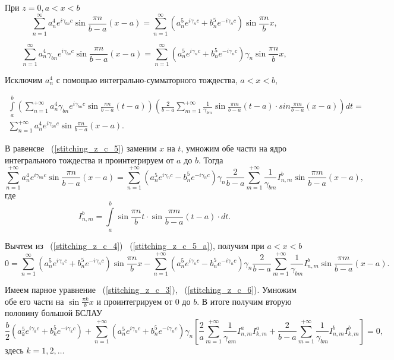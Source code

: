 При $z = 0, a < x < b$
\begin{equation}
	\label{stitching_z_c_4}
	\sum\limits_{n=1}^{\infty}a_n^4e^{i\gamma_{bn}c}\sin{\frac{\pi n}{b-a}(x-a)} = \sum\limits_{n=1}^{\infty}\left(a_n^5e^{i\gamma_{n}c}+b_n^5e^{-i\gamma_{n}c}\right)\sin{\frac{\pi n}{b}x},	
\end{equation}

\begin{equation}
	\label{stitching_z_c_5}
	\sum\limits_{n=1}^{\infty}a_n^4\gamma_{bn}e^{i\gamma_{bn}c}\sin{\frac{\pi n}{b-a}(x-a)} = \sum\limits_{n=1}^{\infty}\left(a_n^5e^{i\gamma_{n}c}+b_n^5e^{-i\gamma_{n}c}\right)\gamma_{n}\sin{\frac{\pi n}{b}x},	
\end{equation}

Исключим $a_n^4$ с помощью интегрально-сумматорного тождества, $a < x < b$,

\begin{multline*}
	\int\limits_a^b\left(\sum\limits_{n=1}^{+\infty}a_n^4\gamma_{bn}e^{i\gamma_{bn}c}\sin{\frac{\pi n}{b-a}(t-a)}\right)\left(\frac{2}{b-a}\sum\limits_{m=1}^{+\infty}\frac{1}{\gamma_{bm}}\sin{\frac{\pi m}{b-a}(t-a)} \cdot sin{\frac{\pi m}{b-a}(x-a)}\right)dt
	= \\
	\sum\limits_{n=1}^{+\infty}a_n^4e^{i\gamma_{bn}c}\sin{\frac{\pi n}{b-a}(x-a)}.
\end{multline*}

В равенсве ~(\ref{stitching_z_c_5}) заменим $x$ на $t$, умножим обе части на ядро интегрального тождества и проинтегрируем от $a$ до $b$. Тогда
\begin{equation}
	\label{stitching_z_c_5_a}
	\sum\limits_{n=1}^{+\infty}a_n^4e^{i\gamma_{bn}c}\sin{\frac{\pi n}{b-a}(x-a)} = \sum\limits_{n=1}^{+\infty}\left(a_n^5e^{i\gamma_{n}c}-b_n^5e^{-i\gamma_{n}c}\right)\gamma_{n}\frac{2}{b-a}\sum\limits_{m=1}^{+\infty}\frac{1}{\gamma_{bm}}I_{n,m}^b\sin{\frac{\pi m}{b-a}(x-a)},
\end{equation}
где
$$
	I_{n,m}^b = \int\limits_a^b\sin{\frac{\pi n}{b}t} \cdot \sin{\frac{\pi m}{b-a}(t-a)} \cdot dt.
$$

Вычтем из ~(\ref{stitching_z_c_4}) ~(\ref{stitching_z_c_5_a}), получим при $a < x < b$
\begin{equation}
	\label{stitching_z_c_6}
	0 = \sum\limits_{n=1}^{\infty}\left(a_n^5e^{i\gamma_{n}c}+b_n^5e^{-i\gamma_{n}c}\right)\sin{\frac{\pi n}{b}x} - \sum\limits_{n=1}^{+\infty}\left(a_n^5e^{i\gamma_{n}c}-b_n^5e^{-i\gamma_{n}c}\right)\gamma_{n}\frac{2}{b-a}\sum\limits_{m=1}^{+\infty}\frac{1}{\gamma_{bm}}I_{n,m}^b\sin{\frac{\pi m}{b-a}(x-a)}.
\end{equation}

Имеем парное уравнение ~(\ref{stitching_z_c_3}), ~(\ref{stitching_z_c_6}). Умножим обе его части на $\sin{\frac{\pi k}{b}x}$ и проинтегрируем от $0$ до $b$. В итоге получим вторую половину большой БСЛАУ
\begin{equation}
	\frac{b}{2}\left(a_k^5e^{i\gamma_{k}c}+b_k^5e^{-i\gamma_{k}c}\right)+\sum\limits_{n=1}^{+\infty}\left(a_n^5e^{i\gamma_{n}c}+b_n^5e^{-i\gamma_{n}c}\right)\gamma_{n}\left[\frac{2}{a}\sum\limits_{m=1}^{+\infty}\frac{1}{\gamma_{am}}I_{n,m}^aI_{k,m}^a+\frac{2}{b-a}\sum\limits_{m=1}^{+\infty}\frac{1}{\gamma_{bm}}I_{n,m}^bI_{k,m}^b\right] = 0,
\end{equation}
здесь $k = 1, 2, \dots$